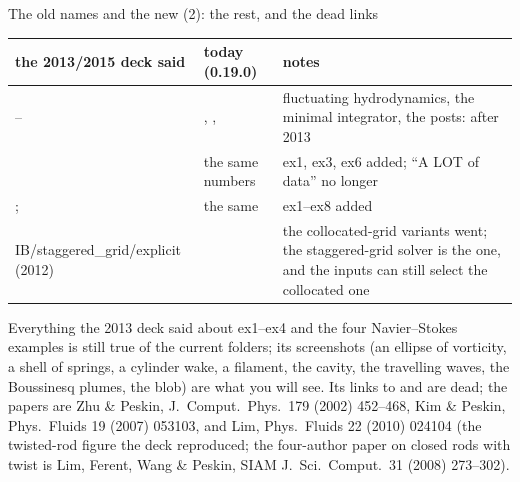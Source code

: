 \documentclass[aspectratio=169,11pt]{beamer}
\begin{document}
\begin{frame}{The old names and the new (2): the rest, and the dead links}
\label{fr:oldnames2}
\scriptsize
\setlength{\tabcolsep}{3pt}
\begin{tabular}{@{}L{0.3\textwidth}L{0.26\textwidth}L{0.38\textwidth}@{}}
\toprule
the 2013/2015 deck said & today (0.19.0) & notes\\
\midrule
-- & , ,  & fluctuating hydrodynamics, the minimal integrator, the posts: after 2013\\
 & the same numbers & ex1, ex3, ex6 added; ``A LOT of data'' no longer\\
;  & the same &  ex1--ex8 added\\
IB/staggered\_grid/explicit (2012) &  & the collocated-grid variants went; the staggered-grid solver is the one, and the inputs can still select the collocated one\\
\bottomrule
\end{tabular}
\vspace{1mm}

\scriptsize Everything the 2013 deck said about ex1--ex4 and the four Navier--Stokes examples is still true of the current folders; its screenshots (an ellipse of vorticity, a shell of springs, a cylinder wake, a filament, the cavity, the travelling waves, the Boussinesq plumes, the blob) are what you will see. Its links to  and  are dead; the papers are Zhu \& Peskin, J.\ Comput.\ Phys.\ 179 (2002) 452--468, Kim \& Peskin, Phys.\ Fluids 19 (2007) 053103, and Lim, Phys.\ Fluids 22 (2010) 024104 (the twisted-rod figure the deck reproduced; the four-author paper on closed rods with twist is Lim, Ferent, Wang \& Peskin, SIAM J.\ Sci.\ Comput.\ 31 (2008) 273--302).
\end{frame}
\end{document}
